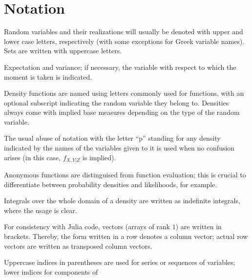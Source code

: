 \chapter*{Notation}
\label{cha:notation}

\begin{description}[style=nextline, leftmargin=4cm]
\item[\(\Prob{\Theta \in A \given X = x}\)] Random variables and their realizations will usually be
  denoted with upper and lower case letters, respectively
  (with some exceptions for Greek variable names).  Sets
  are written with uppercase letters.
\item[{\(\Exp{X}, \Var[X]{f(X, Y)}\)}] Expectation and variance; if necessary, the variable with
  respect to which the moment is taken is indicated.
\item[\(\phi(x), f_{Z}(x)\)] Density functions are named using letters commonly used for functions,
  with an optional subscript indicating the random variable they belong to.  Densities always come
  with implied base measures depending on the type of the random variable.
\item[\(\prob{x, y \given z}\)] The usual abuse of notation with the letter \enquote{p} standing for
  any density indicated by the names of the variables given to it is used when no confusion arises
  (in this case, \(f_{X,Y|Z}\) is implied).
\item[{\(y \mapsto \prob{x \given y, z}\)}] Anonymous functions are distinguised from function
  evaluation; this is crucial to differentiate between probability densities and likelihoods, for
  example.
\item[\(\int \prob{x} \dif x = 1\)] Integrals over the whole domain of a density are written as
  indefinite integrals, where the usage is clear.
\item[{\([x, y, z] = \smash[b]{\begin{bsmallmatrix}x\\y\\z\end{bsmallmatrix}}\)}] For consistency
  with Julia code, vectors (arrays of rank \(1\)) are written in brackets.  Thereby, the form
  written in a row denotes a column vector; actual row vectors are written as transposed column
  vectors.
\item[{\(\kth{\Theta} = [\kth{\Theta}_1, \ldots, \kth{\Theta}_N]\)}] Uppercase indices in
  parentheses are used for series or sequences of variables; lower indices for components of

\end{description}
